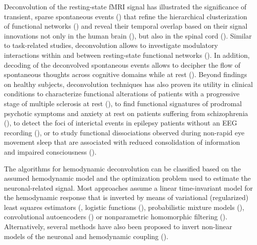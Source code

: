 Deconvolution of the resting-state fMRI signal has illustrated the significance of transient, sparse spontaneous events (\citealt{Petridou2012PeriodsrestfMRI,Allan2015FunctionalConnectivityMRI}) that refine the hierarchical clusterization of functional networks (\citealt{Karahanoglu2013TotalactivationfMRI}) and reveal their temporal overlap based on their signal innovations not only in the human brain (\citealt{Karahanoglu2015Transientbrainactivity}), but also in the spinal cord (\citealt{kinany2020DynamicFunctionalConnectivity}). Similar to task-related studies, deconvolution allows to investigate modulatory interactions within and between resting-state functional networks (\citealt{Di2013ModulatoryInteractionsResting,Di2015Characterizationsrestingstate}). In addition, decoding of the deconvolved spontaneous events allows to decipher the flow of spontaneous thoughts across cognitive domains while at rest (\citealt{Karahanoglu2015Transientbrainactivity,GonzalezCastillo2019Imagingspontaneousflow}). Beyond findings on healthy subjects, deconvolution techniques has also proven its utility in clinical conditions to characterize functional alterations of patients with a progressive stage of multiple sclerosis at rest (\citealt{Bommarito2020Alteredanteriordefault}), to find functional signatures of prodromal psychotic symptoms and anxiety at rest on patients suffering from schizophrenia (\citealt{Zoeller2019Largescalebrain}), to detect the foci of interictal events in epilepsy patients without an EEG recording (\citealt{Lopes2012Detectionepilepticactivity,Karahanoglu2013Spatialmappinginterictal}), or to study functional dissociations observed during non-rapid eye movement sleep that are associated with reduced consolidation of information and impaired consciousness (\citealt{Tarun2020NREMsleepstages}).

The algorithms for hemodynamic deconvolution can be classified based on the assumed hemodynamic model and the optimization problem used to estimate the neuronal-related signal. Most approaches assume a linear time-invariant model for the hemodynamic response that is inverted by means of variational (regularized) least squares estimators (\citealt{Glover1999DeconvolutionImpulseResponse,Gitelman2003Modelingregionalpsychophysiologic,Gaudes2010Detectioncharacterizationsingle,Gaudes2012Structuredsparsedeconvolution,Gaudes2013Paradigmfreemapping,CaballeroGaudes2019deconvolutionalgorithmmulti,HernandezGarcia2011Neuronaleventdetection,Karahanoglu2013TotalactivationfMRI,Cherkaoui2019SparsitybasedBlind,Costantini2021ParadigmFreeRegularization,Huetel2021Hemodynamicmatrixfactorization}, logistic functions (\citealt{Bush2013Decodingneuralevents,Bush2015deconvolutionbasedapproach,Loula2018DecodingfMRIactivity}), probabilistic mixture models (\cite{Pidnebesna2019EstimatingSparseNeuronal}), convolutional autoencoders (\citealt{Huetel2018NeuralActivationEstimation}) or nonparametric homomorphic filtering (\citealt{Sreenivasan2015NonparametricHemodynamicDeconvolution}). Alternatively, several methods have also been proposed to invert non-linear models of the neuronal and hemodynamic coupling (\citealt{Riera2004statespacemodel,Friston2008DEMvariationaltreatment,Havlicek2011Dynamicmodelingneuronal,Aslan2016Jointstateparameter,Madi2017HybridCubatureKalman,ruizeuler2018nonlinear}). 

